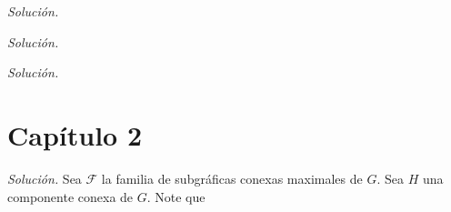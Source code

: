 \documentclass[12pt]{article}
\newenvironment{problem}[2][Problema]{\begin{trivlist}
\item[\hskip \labelsep {\bfseries #1}\hskip \labelsep {\bfseries #2}]}{\end{trivlist}}
\begin{document}
\begin{problem}{1.4.1}

\end{problem}
\textit{Solución.}


\begin{problem}{1.4.5}

\end{problem}
\textit{Solución.}


\begin{problem}{1.4.6}

\end{problem}
\textit{Solución.}

\section*{Capítulo 2}


\begin{problem}{2.1.1}

\end{problem}
\textit{Solución.} Sea $\mathcal F$ la familia de subgráficas conexas maximales de $G.$ Sea $H$ una componente conexa de $G.$ Note que 
\end{document}
